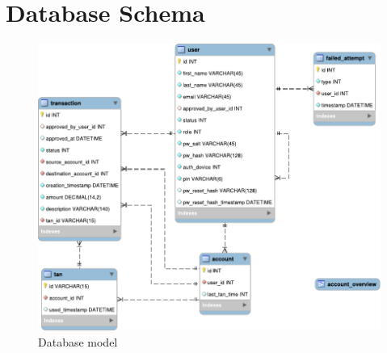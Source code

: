 \section{Database Schema}\label{section:db}
\begin{figure}[h!tbp]
	\centering
	\includegraphics[width=\textwidth]{figures/database_model}
	\caption{Database model}
	\label{figure:dbmodel}
\end{figure}

